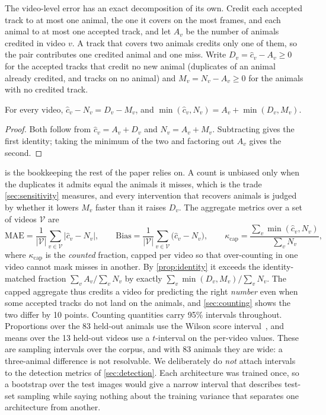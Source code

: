 The video-level error has an exact decomposition of its own. Credit each accepted track to
at most one animal, the one it covers on the most frames, and each animal to at most one
accepted track, and let $A_v$ be the number of animals credited in video $v$. A track that
covers two animals credits only one of them, so the pair contributes one credited animal and
one miss. Write $D_v=\hat{c}_v-A_v\ge0$ for the accepted tracks that credit no new animal
(duplicates of an animal already credited, and tracks on no animal) and $M_v=N_v-A_v\ge0$ for
the animals with no credited track.

\begin{proposition}
\label{prop:identity}
For every video, $\hat{c}_v-N_v=D_v-M_v$, and
$\min(\hat{c}_v,N_v)=A_v+\min(D_v,M_v)$.
\end{proposition}
\begin{proof}
Both follow from $\hat{c}_v=A_v+D_v$ and $N_v=A_v+M_v$. Subtracting gives the first
identity; taking the minimum of the two and factoring out $A_v$ gives the second.
\end{proof}

 is the bookkeeping the rest of the paper relies on. A count is unbiased
only when the duplicates it admits equal the animals it misses, which is the trade
\cref{sec:sensitivity} measures, and every intervention that recovers animals is judged by
whether it lowers $M_v$ faster than it raises $D_v$. The aggregate metrics over a set of
videos $\mathcal{V}$ are
\begin{equation}
\mathrm{MAE}=\frac{1}{|\mathcal{V}|}\sum_{v\in\mathcal{V}}\bigl|\hat{c}_v-N_v\bigr|,
\qquad
\mathrm{Bias}=\frac{1}{|\mathcal{V}|}\sum_{v\in\mathcal{V}}\bigl(\hat{c}_v-N_v\bigr),
\qquad
\kappa_{\mathrm{cap}}=\frac{\sum_{v}\min(\hat{c}_v,N_v)}{\sum_{v}N_v},
\label{eq:metrics}
\end{equation}
where $\kappa_{\mathrm{cap}}$ is the \emph{counted} fraction, capped per video so that
over-counting in one video cannot mask misses in another. By \cref{prop:identity} it exceeds
the identity-matched fraction $\sum_v A_v/\sum_v N_v$ by exactly $\sum_v\min(D_v,M_v)/\sum_v
N_v$. The capped aggregate thus credits a video for predicting the right \emph{number} even
when some accepted tracks do not land on the animals, and \cref{sec:counting} shows the two
differ by 10 points. Counting quantities carry 95\% intervals throughout. Proportions over
the 83 held-out animals use the Wilson score interval~\cite{wilson1927probable}, and means
over the 13 held-out videos use a $t$-interval on the per-video values. These are sampling
intervals over the corpus, and with 83 animals they are wide: a three-animal difference is
not resolvable. We deliberately do \emph{not} attach intervals to the detection metrics of
\cref{sec:detection}. Each architecture was trained once, so a bootstrap over the test
images would give a narrow interval that describes test-set sampling while saying nothing
about the training variance that separates one architecture from another.

